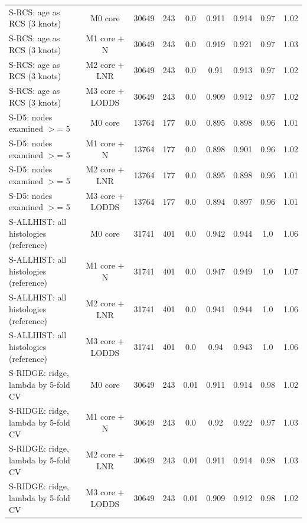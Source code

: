\begin{table}[htbp]
{\begin{tabular}{@{}lcccccccc@{}}
S-RCS: age as RCS (3 knots) & M0 core & 30649 & 243 & 0.0 & 0.911 & 0.914 & 0.97 & 1.02 \\
S-RCS: age as RCS (3 knots) & M1 core + N & 30649 & 243 & 0.0 & 0.919 & 0.921 & 0.97 & 1.03 \\
S-RCS: age as RCS (3 knots) & M2 core + LNR & 30649 & 243 & 0.0 & 0.91 & 0.913 & 0.97 & 1.02 \\
S-RCS: age as RCS (3 knots) & M3 core + LODDS & 30649 & 243 & 0.0 & 0.909 & 0.912 & 0.97 & 1.02 \\
S-D5: nodes examined $>$= 5 & M0 core & 13764 & 177 & 0.0 & 0.895 & 0.898 & 0.96 & 1.01 \\
S-D5: nodes examined $>$= 5 & M1 core + N & 13764 & 177 & 0.0 & 0.898 & 0.901 & 0.96 & 1.02 \\
S-D5: nodes examined $>$= 5 & M2 core + LNR & 13764 & 177 & 0.0 & 0.895 & 0.898 & 0.96 & 1.01 \\
S-D5: nodes examined $>$= 5 & M3 core + LODDS & 13764 & 177 & 0.0 & 0.894 & 0.897 & 0.96 & 1.01 \\
S-ALLHIST: all histologies (reference) & M0 core & 31741 & 401 & 0.0 & 0.942 & 0.944 & 1.0 & 1.06 \\
S-ALLHIST: all histologies (reference) & M1 core + N & 31741 & 401 & 0.0 & 0.947 & 0.949 & 1.0 & 1.07 \\
S-ALLHIST: all histologies (reference) & M2 core + LNR & 31741 & 401 & 0.0 & 0.941 & 0.944 & 1.0 & 1.06 \\
S-ALLHIST: all histologies (reference) & M3 core + LODDS & 31741 & 401 & 0.0 & 0.94 & 0.943 & 1.0 & 1.06 \\
S-RIDGE: ridge, lambda by 5-fold CV & M0 core & 30649 & 243 & 0.01 & 0.911 & 0.914 & 0.98 & 1.02 \\
S-RIDGE: ridge, lambda by 5-fold CV & M1 core + N & 30649 & 243 & 0.0 & 0.92 & 0.922 & 0.97 & 1.03 \\
S-RIDGE: ridge, lambda by 5-fold CV & M2 core + LNR & 30649 & 243 & 0.01 & 0.911 & 0.914 & 0.98 & 1.03 \\
S-RIDGE: ridge, lambda by 5-fold CV & M3 core + LODDS & 30649 & 243 & 0.01 & 0.909 & 0.912 & 0.98 & 1.02 \\
\bottomrule
\end{tabular}}
\end{table}
